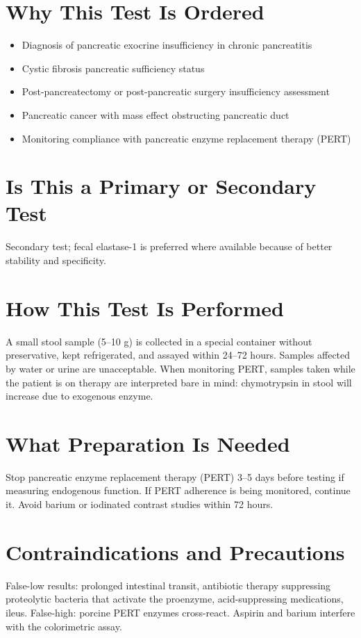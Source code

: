 \section*{Why This Test Is Ordered}
\begin{itemize}
  \item Diagnosis of pancreatic exocrine insufficiency in chronic pancreatitis
  \item Cystic fibrosis pancreatic sufficiency status
  \item Post-pancreatectomy or post-pancreatic surgery insufficiency assessment
  \item Pancreatic cancer with mass effect obstructing pancreatic duct
  \item Monitoring compliance with pancreatic enzyme replacement therapy (PERT)
\end{itemize}

\section*{Is This a Primary or Secondary Test}
Secondary test; fecal elastase-1 is preferred where available because of better stability and specificity.

\section*{How This Test Is Performed}
A small stool sample (5--10 g) is collected in a special container without preservative, kept refrigerated, and assayed within 24--72 hours. Samples affected by water or urine are unacceptable. When monitoring PERT, samples taken while the patient is on therapy are interpreted bare in mind: chymotrypsin in stool will increase due to exogenous enzyme.

\section*{What Preparation Is Needed}
Stop pancreatic enzyme replacement therapy (PERT) 3--5 days before testing if measuring endogenous function. If PERT adherence is being monitored, continue it. Avoid barium or iodinated contrast studies within 72 hours.

\section*{Contraindications and Precautions}
False-low results: prolonged intestinal transit, antibiotic therapy suppressing proteolytic bacteria that activate the proenzyme, acid-suppressing medications, ileus. False-high: porcine PERT enzymes cross-react. Aspirin and barium interfere with the colorimetric assay.


